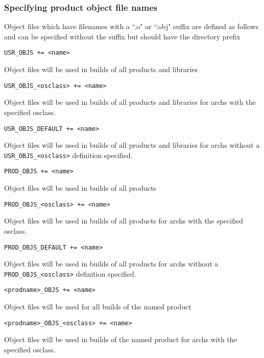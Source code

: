 \subsubsection{Specifying product object file names}

Object files which have filenames with a ``.o" or ``.obj" suffix are defined as follows and can be specified without the 
suffix but should have the directory prefix 

\begin{description}

\item {}\verb|USR_OBJS += <name>|

Object files will be used in builds of all products and libraries

\item \verb|USR_OBJS_<osclass> += <name>|

Object files will be used in builds of all products and libraries for archs with the specified osclass.

\item \verb|USR_OBJS_DEFAULT += <name>|

Object files will be used in builds of all products and libraries for archs without a \verb|USR_OBJS_<osclass>| 
definition specified.

\item {}\verb|PROD_OBJS += <name>|

Object files will be used in builds of all products

\item \verb|PROD_OBJS_<osclass> += <name>|

Object files will be used in builds of all products for archs with the specified osclass.

\item \verb|PROD_OBJS_DEFAULT += <name>|

Object files will be used in builds of all products for archs without a \verb|PROD_OBJS_<osclass>| definition 
specified.

\item {}\verb|<prodname>_OBJS += <name>|

Object files will be used for all builds of the named product

\item \verb|<prodname>_OBJS_<osclass> += <name>| 

Object files will be used in builds of the named product for archs with the specified osclass.


\end{description}
